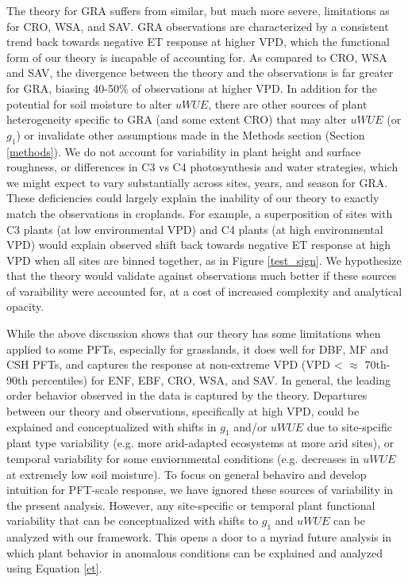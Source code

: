 \documentclass[draft,linenumbers]{agujournal}
\begin{document}
The theory for GRA suffers from similar, but much more severe,
limitations as for CRO, WSA, and SAV. GRA observations are
characterized by a consistent trend back towards negative ET response
at higher VPD, which the functional form of our theory is incapable of
accounting for. As compared to CRO, WSA and SAV, the divergence
between the theory and the observations is far greater for GRA,
biasing 40-50\% of observations at higher VPD. In addition for the
potential for soil moisture to alter $uWUE$, there are other sources
of plant heterogeneity specific to GRA (and some extent CRO) that may
alter $uWUE$ (or $g_1$) or invalidate other assumptions made in the
Methods section (Section \ref{methods}). We do not account for
variability in plant height and surface roughness, or differences in
C3 vs C4 photosynthesis and water strategies, which we might expect to
vary substantially across sites, years, and season for GRA. These
deficiencies could largely explain the inability of our theory to
exactly match the observations in croplands. For example, a
superposition of sites with C3 plants (at low environmental VPD) and
C4 plants (at high environmental VPD) would explain observed shift
back towards negative ET response at high VPD when all sites are
binned together, as in Figure \ref{test_sign}. We hypothesize that the
theory would validate against observations much better if these
sources of varaibility were accounted for, at a cost of increased
complexity and analytical opacity.


While the above discussion shows that our theory has some limitations
when applied to some PFTs, especially for grasslands, it does well for
DBF, MF and CSH PFTs, and captures the response at non-extreme VPD
(VPD < $\approx$ 70th-90th percentiles) for
ENF, EBF, CRO, WSA, and SAV. In general, the leading order behavior
observed in the data is captured by the theory. Departures between our
theory and observations, specifically at high VPD, could be explained
and conceptualized with shifts in $g_1$ and/or $uWUE$ due to
site-spcific plant type variability (e.g. more arid-adapted ecosystems
at more arid sites), or temporal variability for some enviornmental
conditions (e.g. decreases in $uWUE$ at extremely low soil
moisture). To focus on general behaviro and develop intuition for
PFT-scale response, we have ignored these sources of variability in
the present analysis. However, any site-specific or temporal plant
functional variability that can be conceptualized with shifts to $g_1$
and $uWUE$ can be analyzed with our framework. This opens a door to a
myriad future analysis in which plant behavior in anomalous conditions
can be explained and analyzed using Equation \ref{et}.
\end{document}
